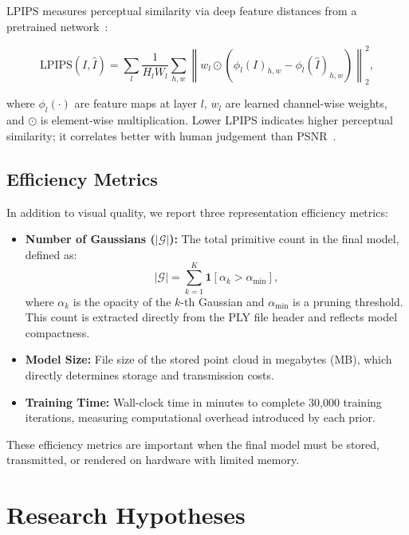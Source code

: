 LPIPS measures perceptual similarity via deep feature distances from a pretrained network~\cite{zhang2018lpips}:

\begin{equation}
\mathrm{LPIPS}(I, \hat{I}) =
\sum_{l} \frac{1}{H_l W_l}
\sum_{h,w} \left\| w_l \odot
\left( \phi_l(I)_{h,w} - \phi_l(\hat{I})_{h,w} \right) \right\|_2^2,
\end{equation}

where $\phi_l(\cdot)$ are feature maps at layer $l$, $w_l$ are learned channel-wise weights, and $\odot$ is element-wise multiplication. Lower LPIPS indicates higher perceptual similarity; it correlates better with human judgement than PSNR~\cite{kerbl20233dgs}.

\subsection{Efficiency Metrics}

In addition to visual quality, we report three representation efficiency metrics:

\begin{itemize}
    \item \textbf{Number of Gaussians ($|\mathcal{G}|$):} The total primitive count in the final model, defined as:
    \begin{equation}
        |\mathcal{G}| = \sum_{k=1}^{K} \mathbf{1}[\alpha_k > \alpha_{\min}],
    \end{equation}
    where $\alpha_k$ is the opacity of the $k$-th Gaussian and $\alpha_{\min}$ is a pruning threshold. This count is extracted directly from the PLY file header and reflects model compactness.

    \item \textbf{Model Size:} File size of the stored point cloud in megabytes (MB), which directly determines storage and transmission costs.

    \item \textbf{Training Time:} Wall-clock time in minutes to complete 30,000 training iterations, measuring computational overhead introduced by each prior.
\end{itemize}

These efficiency metrics are important when the final model must be stored, transmitted, or rendered on hardware with limited memory.

\section{Research Hypotheses}

